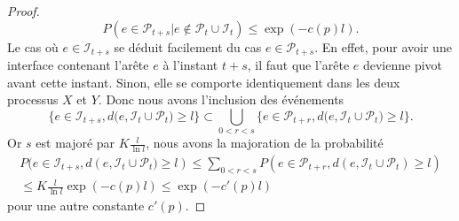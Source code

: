 \documentclass[titlepage,a4paper,12pt]{article}
\begin{document}
\begin{proof}
$$P(e\in \mathcal{P}_{t+s}|e\notin \mathcal{P}_t\cup \mathcal{I}_t) \leqslant \exp(-c(p)l).
$$
Le cas où $e\in \mathcal{I}_{t+s}$ se déduit facilement du cas $e\in \mathcal{P}_{t+s}$. En effet, pour avoir une interface contenant l'arête $e$ à l'instant $t+s$, il faut que l'arête $e$ devienne pivot avant cette instant. Sinon, elle se comporte identiquement dans les deux processus $X$ et $Y$. Donc nous avons l'inclusion des événements 
$$ \big\{ e\in \mathcal{I}_{t+s}, d(e,\mathcal{I}_t \cup \mathcal{P}_{t}\big) \geqslant l\} \subset \bigcup_{0<r<s}\big\{ e\in \mathcal{P}_{t+r}, d(e,\mathcal{I}_t \cup \mathcal{P}_{t}\big) \geqslant l\}.
$$
Or $s$ est majoré par $\displaystyle K\frac{l}{\ln l}$, nous avons la majoration de la probabilité
\begin{multline*} P(e\in \mathcal{I}_{t+s}, d(e,\mathcal{I}_t \cup \mathcal{P}_{t}\big) \geqslant l) \leqslant \sum_{0<r<s} P(e\in \mathcal{P}_{t+r}, d(e,\mathcal{I}_t \cup \mathcal{P}_{t})\geqslant l) \\ \leqslant K\frac{l}{\ln l}\exp(-c(p)l)\leqslant \exp(-c'(p)l)
\end{multline*}
pour une autre constante $c'(p)$. 
\end{proof}
\end{document}
